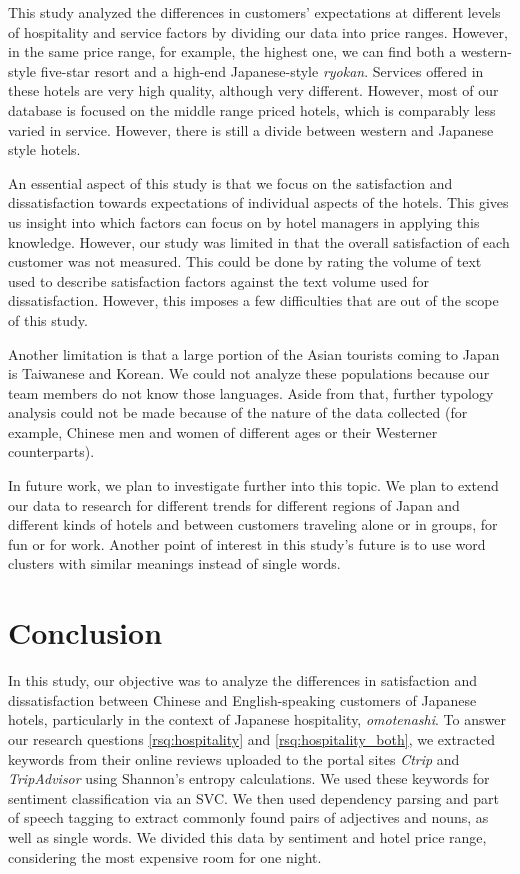 \documentclass[smallextended,natbib]{svjour3}       %
\begin{document}
  This study analyzed the differences in customers' expectations at different levels of hospitality and service factors by dividing our data into price ranges. However, in the same price range, for example, the highest one, we can find both a western-style five-star resort and a high-end Japanese-style \textit{ryokan}. Services offered in these hotels are very high quality, although very different. However, most of our database is focused on the middle range priced hotels, which is comparably less varied in service. However, there is still a divide between western and Japanese style hotels.

  An essential aspect of this study is that we focus on the satisfaction and dissatisfaction towards expectations of individual aspects of the hotels. This gives us insight into which factors can focus on by hotel managers in applying this knowledge. However, our study was limited in that the overall satisfaction of each customer was not measured. This could be done by rating the volume of text used to describe satisfaction factors against the text volume used for dissatisfaction. However, this imposes a few difficulties that are out of the scope of this study. 

  Another limitation is that a large portion of the Asian tourists coming to Japan is Taiwanese and Korean. We could not analyze these populations because our team members do not know those languages. Aside from that, further typology analysis could not be made because of the nature of the data collected (for example, Chinese men and women of different ages or their Westerner counterparts).

  In future work, we plan to investigate further into this topic. We plan to extend our data to research for different trends for different regions of Japan and different kinds of hotels and between customers traveling alone or in groups, for fun or for work. Another point of interest in this study's future is to use word clusters with similar meanings instead of single words. 

\section{Conclusion}\label{conclusion}

  In this study, our objective was to analyze the differences in satisfaction and dissatisfaction between Chinese and English-speaking customers of Japanese hotels, particularly in the context of Japanese hospitality, \textit{omotenashi}. To answer our research questions \ref{rsq:hospitality} and \ref{rsq:hospitality_both}, we extracted keywords from their online reviews uploaded to the portal sites \textit{Ctrip} and \textit{TripAdvisor} using Shannon's entropy calculations. We used these keywords for sentiment classification via an SVC. We then used dependency parsing and part of speech tagging to extract commonly found pairs of adjectives and nouns, as well as single words. We divided this data by sentiment and hotel price range, considering the most expensive room for one night. 
\end{document}
